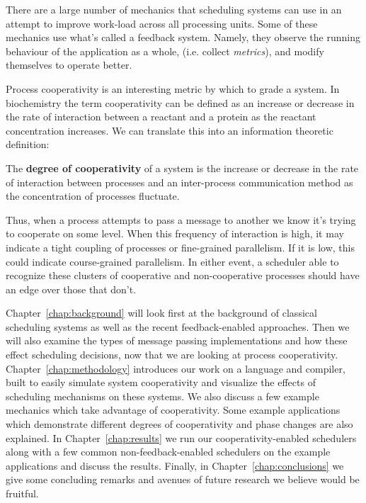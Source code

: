 There are a large number of mechanics that scheduling systems can use in an 
attempt to improve work-load across all processing units. Some of these 
mechanics use what's called a feedback system. Namely, they observe the 
running behaviour of the application as a whole, (i.e. collect {\em metrics}),
and modify themselves to operate better.

Process cooperativity is an interesting metric by which to grade a system. In
biochemistry the term cooperativity can be defined as an increase or decrease
in the rate of interaction between a reactant and a protein as the reactant
concentration increases. We can translate this into an information theoretic 
definition: 
\begin{newdef}
    The {\bf degree of cooperativity} of a system is the increase or decrease 
    in the rate of interaction between processes and an inter-process 
    communication method as the concentration of processes fluctuate.
\end{newdef}

Thus, when a process attempts to pass a message to another we know it's trying 
to cooperate on some level. When this frequency of interaction is high, it may
indicate a tight coupling of processes or fine-grained parallelism. If it is 
low, this could indicate course-grained parallelism. In either event, a 
scheduler able to recognize these clusters of cooperative and non-cooperative 
processes should have an edge over those that don't.

Chapter~\ref{chap:background} will look first at the background of classical 
scheduling systems as well as the recent feedback-enabled approaches. Then we 
will also examine the types of message passing implementations and how these
effect scheduling decisions, now that we are looking at process cooperativity.
Chapter~\ref{chap:methodology} introduces our work on a language and compiler,
built to easily simulate system cooperativity and visualize the effects of 
scheduling mechanisms on these systems. We also discuss a few example mechanics
which take advantage of cooperativity. Some example applications which 
demonstrate different degrees of cooperativity and phase changes are also 
explained.
In Chapter~\ref{chap:results} we run our cooperativity-enabled schedulers along
with a few common non-feedback-enabled schedulers on the example applications
and discuss the results. 
Finally, in Chapter~\ref{chap:conclusions} we give some concluding remarks and
avenues of future research we believe would be fruitful.

